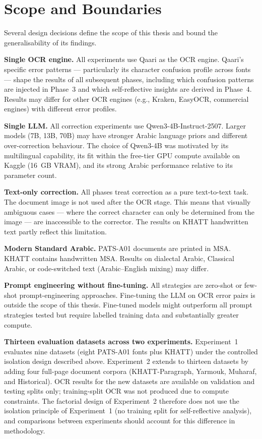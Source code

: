 \section{Scope and Boundaries}
\label{sec:intro_scope}

Several design decisions define the scope of this thesis and bound the
generalisability of its findings.

\textbf{Single OCR engine.} All experiments use Qaari as the OCR engine.
Qaari's specific error patterns --- particularly its character confusion
profile across fonts --- shape the results of all subsequent phases,
including which confusion patterns are injected in Phase~3 and which
self-reflective insights are derived in Phase~4. Results may differ for
other OCR engines (e.g., Kraken, EasyOCR, commercial engines) with
different error profiles.

\textbf{Single LLM.} All correction experiments use
Qwen3-4B-Instruct-2507. Larger models (7B, 13B, 70B) may have stronger
Arabic language priors and different over-correction behaviour. The choice
of Qwen3-4B was motivated by its multilingual capability, its fit within
the free-tier GPU compute available on Kaggle (16~GB VRAM), and its strong
Arabic performance relative to its parameter count.

\textbf{Text-only correction.} All phases treat correction as a pure
text-to-text task. The document image is not used after the OCR stage. This
means that visually ambiguous cases --- where the correct character can only
be determined from the image --- are inaccessible to the corrector. The
results on KHATT handwritten text partly reflect this limitation.

\textbf{Modern Standard Arabic.} PATS-A01 documents are printed in MSA.
KHATT contains handwritten MSA. Results on dialectal Arabic, Classical
Arabic, or code-switched text (Arabic--English mixing) may differ.

\textbf{Prompt engineering without fine-tuning.} All strategies are
zero-shot or few-shot prompt-engineering approaches. Fine-tuning the LLM
on OCR error pairs is outside the scope of this thesis. Fine-tuned models
might outperform all prompt strategies tested but require labelled training
data and substantially greater compute.

\textbf{Thirteen evaluation datasets across two experiments.}
Experiment~1 evaluates nine datasets (eight PATS-A01 fonts plus KHATT) under
the controlled isolation design described above. Experiment~2 extends to
thirteen datasets by adding four full-page document corpora (KHATT-Paragraph,
Yarmouk, Muharaf, and Historical). OCR results for the new datasets are
available on validation and testing splits only; training-split OCR was not
produced due to compute constraints. The factorial design of Experiment~2
therefore does not use the isolation principle of Experiment~1 (no training
split for self-reflective analysis), and comparisons between experiments
should account for this difference in methodology.

